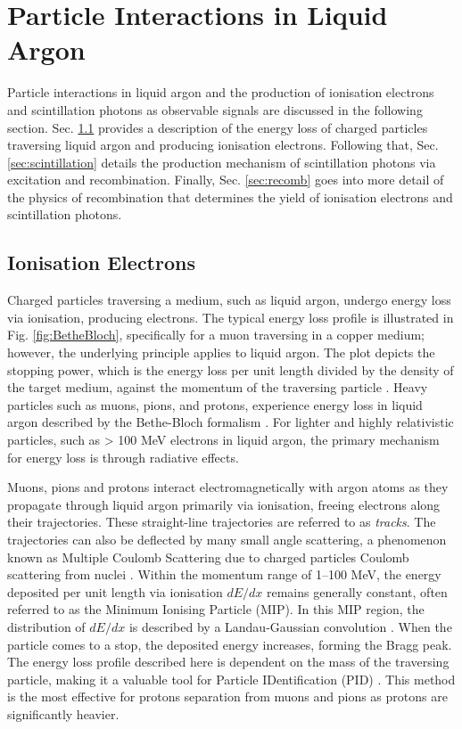 \section{Particle Interactions in Liquid Argon}
\label{sec3:creation}

Particle interactions in liquid argon and the production of ionisation electrons and scintillation photons as observable signals are discussed in the following section.       
Sec. \ref{sec3:bethebloch} provides a description of the energy loss of charged particles traversing liquid argon and producing ionisation electrons.                          
Following that, Sec. \ref{sec:scintillation} details the production mechanism of scintillation photons via excitation and recombination.                                       
Finally, Sec. \ref{sec:recomb} goes into more detail of the physics of recombination that determines the yield of ionisation electrons and scintillation photons.

\subsection{Ionisation Electrons}
\label{sec3:bethebloch}

Charged particles traversing a medium, such as liquid argon, undergo energy loss via ionisation, producing electrons.                                                                       
The typical energy loss profile is illustrated in Fig. \ref{fig:BetheBloch}, specifically for a muon traversing in a copper medium; however, the underlying principle applies to liquid argon.
The plot depicts the stopping power, which is the energy loss per unit length divided by the density of the target medium, against the momentum of the traversing particle \cite{Passage}.
Heavy particles such as muons, pions, and protons, experience energy loss in liquid argon described by the Bethe-Bloch formalism \cite{Passage}.
For lighter and highly relativistic particles, such as > 100 MeV electrons in liquid argon, the primary mechanism for energy loss is through radiative effects.

Muons, pions and protons interact electromagnetically with argon atoms as they propagate through liquid argon primarily via ionisation, freeing electrons along their trajectories.
These straight-line trajectories are referred to as \textit{tracks}.
The trajectories can also be deflected by many small angle scattering, a phenomenon known as Multiple Coulomb Scattering due to charged particles Coulomb scattering from nuclei \cite{Passage}. 
Within the momentum range of 1--100 MeV, the energy deposited per unit length via ionisation $dE/dx$ remains generally constant, often referred to as the Minimum Ionising Particle (MIP).
In this MIP region, the distribution of $dE/dx$ is described by a Landau-Gaussian convolution \cite{Passage}. 
When the particle comes to a stop, the deposited energy increases, forming the Bragg peak.
The energy loss profile described here is dependent on the mass of the traversing particle, making it a valuable tool for Particle IDentification (PID) \cite{argoneut}.
This method is the most effective for protons separation from muons and pions as protons are significantly heavier.

